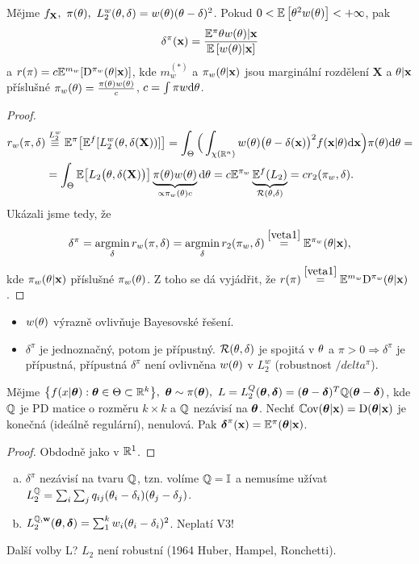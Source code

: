 \begin{theorem}
	Mějme $f_{\textbf{X}},~\pi(\theta),~L_2^w(\theta,\delta)=w(\theta)(\theta-\delta)^2$. Pokud $0<\mathbb{E}\left[ \theta^2w(\theta) \right]<+\infty$, pak $$\delta^\pi(\textbf{x})=\frac{\mathbb{E}^\pi{\theta w(\theta)|\textbf{x}}}{\mathbb{E}\left[ w(\theta)|\textbf{x} \right]}$$
	a $r(\pi)=c\mathbb{E}^{m_w}[\mathrm{D}^{\pi_w}(\theta|\textbf{x})]$, kde $m_w^{(*)}$ a $\pi_w(\theta|\textbf{x})$ jsou marginální rozdělení $\textbf{X}$ a $\theta|\textbf{x}$ příslušné $\pi_w(\theta)=\frac{\pi(\theta)w(\theta)}{c}$, $c=\int\pi w\mathrm{d}\theta$.
	\begin{proof}
		\[
		\begin{split}
		r_w(\pi,\delta)&\stackrel{L_2^w}{\equiv}\mathbb{E}^\pi\big[\mathbb{E}^f[L_2^w(\theta,\delta(\textbf{X}))]\big]=\int_\Theta\Big(\int_{\chi(\mathbb{R}^n)} w(\theta)\big(\theta-\delta(\textbf{x})\big)^2 f(\textbf{x}|\theta)\mathrm{d}\textbf{x}\Big)\pi(\theta)\mathrm{d}\theta=\\
		&= \int_\Theta \mathbb{E}\big[L_2\big(\theta,\delta(\textbf{X})\big)\big]\underbrace{ \pi(\theta)w(\theta)}_{\propto \pi_w(\theta)c}\mathrm{d}\theta = c\mathbb{E}^{\pi_w}\underbrace{\mathbb{E}^f (L_2)}_{\mathcal{R}(\theta,\delta)}=cr_2(\pi_w,\delta).
		\end{split}
		\]
		Ukázali jsme tedy, že  
		$$\delta^\pi=\mathop{\mathrm{argmin}}_\delta r_w(\pi,\delta)=\mathop{\mathrm{argmin}}_\delta r_2(\pi_w,\delta)\stackrel{\ref{veta1}}{=}\mathbb{E}^{\pi_w}(\theta|\textbf{x}),$$
		kde $\pi_w(\theta|\textbf{x})$ příslušné $\pi_w(\theta)$. Z toho se dá vyjádřit, že $r(\pi)\stackrel{\ref{veta1}}{=}\mathbb{E}^{m_w}\mathrm{D}^{\pi_w}(\theta|\textbf{x})$.
	\end{proof}
\end{theorem}
\begin{remark}\begin{itemize}
		\item $w(\theta)$ výrazně ovlivňuje Bayesovské řešení.
		\item $\delta^\pi$ je jednoznačný, potom je přípustný. $\mathcal{R}(\theta,\delta)$ je spojitá v $\theta$ a $\pi>0\Rightarrow\delta^\pi$ je přípustná, přípustná $\delta^\pi$ není ovlivněna $w(\theta)$ v $L_2^w$ (robustnost $/delta^\pi$).
	\end{itemize}
\end{remark}

\begin{theorem}
	Mějme $\big\{ f(x|\boldsymbol{\theta}):\boldsymbol{\theta}\in\Theta\subset\mathbb{R}^k \big\},~\boldsymbol{\theta}\sim\pi(\boldsymbol{\theta}),~L=L_2^Q(\boldsymbol{\theta},\boldsymbol{\delta})=(\boldsymbol{\theta}-\boldsymbol{\delta})^T\mathbb{Q}(\boldsymbol{\theta}-\boldsymbol{\delta})$, kde $\mathbb{Q}$ je PD matice o rozměru $k\times k $ a $\mathbb{Q}$ nezávisí na $\boldsymbol{\theta}$. Nechť $\mathbb{C}\mathrm{ov}(\boldsymbol{\theta}|\textbf{x})=\mathrm{D}(\boldsymbol{\theta}|\textbf{x})$ je konečná (ideálně regulární), nenulová. Pak $\boldsymbol{\delta}^\pi(\textbf{x})=\mathbb{E}^\pi(\boldsymbol{\theta}|\textbf{x})$. 
	\begin{proof}
		Obdodně jako v $\mathbb{R}^1$.
	\end{proof}
\end{theorem}
\begin{remark}
	\begin{enumerate}[a)]
		\item $\delta^\pi$ nezávisí na tvaru $\mathbb{Q}$, tzn. volíme $\mathbb{Q}=\mathbb{I}$ a nemusíme užívat $L_2^{\mathbb{Q}}=\sum_i\sum_j q_{ij}(\theta_i-\delta_i)(\theta_j-\delta_j)$.
		\item $L_2^{\mathbb{Q},\textbf{w}}(\boldsymbol{\theta},\boldsymbol{\delta})=\sum_1^k w_i(\theta_i-\delta_i)^2$. Neplatí V3! 
	\end{enumerate}
\end{remark}
Další volby L?
$L_2$ není robustní (1964 Huber, Hampel, Ronchetti). 

